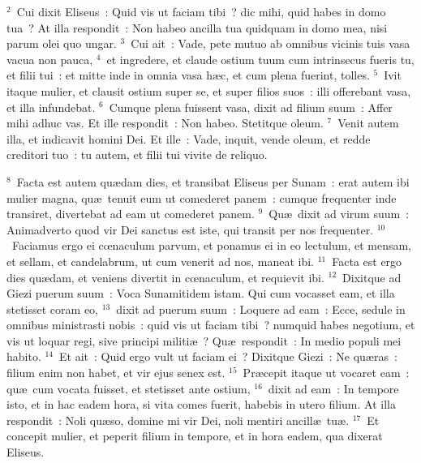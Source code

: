 ${}^{2}$~Cui dixit Eliseus~: Quid vis ut faciam tibi~? dic mihi, quid habes in domo tua~? At illa respondit~: Non habeo ancilla tua quidquam in domo mea, nisi parum olei quo ungar.
${}^{3}$~Cui ait~: Vade, pete mutuo ab omnibus vicinis tuis vasa vacua non pauca,
${}^{4}$~et ingredere, et claude ostium tuum cum intrinsecus fueris tu, et filii tui~: et mitte inde in omnia vasa h\ae c, et cum plena fuerint, tolles.
${}^{5}$~Ivit itaque mulier, et clausit ostium super se, et super filios suos~: illi offerebant vasa, et illa infundebat.
${}^{6}$~Cumque plena fuissent vasa, dixit ad filium suum~: Affer mihi adhuc vas. Et ille respondit~: Non habeo. Stetitque oleum.
${}^{7}$~Venit autem illa, et indicavit homini Dei. Et ille~: Vade, inquit, vende oleum, et redde creditori tuo~: tu autem, et filii tui vivite de reliquo.


${}^{8}$~Facta est autem qu\ae dam dies, et transibat Eliseus per Sunam~: erat autem ibi mulier magna, qu\ae\ tenuit eum ut comederet panem~: cumque frequenter inde transiret, divertebat ad eam ut comederet panem.
${}^{9}$~Qu\ae\ dixit ad virum suum~: Animadverto quod vir Dei sanctus est iste, qui transit per nos frequenter.
${}^{10}$~Faciamus ergo ei cœnaculum parvum, et ponamus ei in eo lectulum, et mensam, et sellam, et candelabrum, ut cum venerit ad nos, maneat ibi.
${}^{11}$~Facta est ergo dies qu\ae dam, et veniens divertit in cœnaculum, et requievit ibi.
${}^{12}$~Dixitque ad Giezi puerum suum~: Voca Sunamitidem istam. Qui cum vocasset eam, et illa stetisset coram eo,
${}^{13}$~dixit ad puerum suum~: Loquere ad eam~: Ecce, sedule in omnibus ministrasti nobis~: quid vis ut faciam tibi~? numquid habes negotium, et vis ut loquar regi, sive principi militi\ae~? Qu\ae\ respondit~: In medio populi mei habito.
${}^{14}$~Et ait~: Quid ergo vult ut faciam ei~? Dixitque Giezi~: Ne qu\ae ras~: filium enim non habet, et vir ejus senex est.
${}^{15}$~Pr\ae cepit itaque ut vocaret eam~: qu\ae\ cum vocata fuisset, et stetisset ante ostium,
${}^{16}$~dixit ad eam~: In tempore isto, et in hac eadem hora, si vita comes fuerit, habebis in utero filium. At illa respondit~: Noli qu\ae so, domine mi vir Dei, noli mentiri ancill\ae\ tu\ae .
${}^{17}$~Et concepit mulier, et peperit filium in tempore, et in hora eadem, qua dixerat Eliseus.


